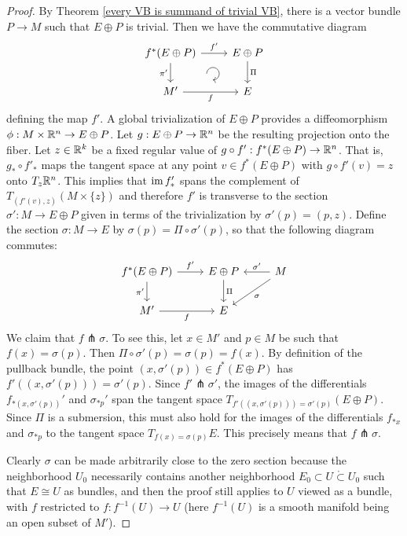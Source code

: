 \begin{proof}
By Theorem \ref{every VB is summand of trivial VB}, there is a vector bundle $P{\to} M$ such that $E\oplus P$ is trivial. Then we have the commutative diagram
    \[\begin{tikzcd}[every matrix/.append style={name=m}, execute at end picture={\draw [<-] ([xshift=-11mm,yshift=1mm]m-2-2.north) arc[start angle=-90,delta angle=270,radius=0.2cm];}]
    f^\ast(E\oplus P) \arrow[r,"f'"]\arrow[d,swap,"\pi'"]& E\oplus P\arrow[d,"\Pi"] \\
    M'\arrow[r,swap,"f"]& E
    \end{tikzcd}\]
defining the map $f'$. A global trivialization of $E\oplus P$ provides a diffeomorphism $\phi:M\times\mathbb{R}^n\to E\oplus P$. Let $g:E\oplus P\to\mathbb{R}^n$ be the resulting projection onto the fiber. Let $z\in\mathbb{R}^k$ be a fixed regular value of $g\circ f':f^\ast(E\oplus P)\to\mathbb{R}^n$. That is, $g_\ast \circ f'_\ast$ maps the tangent space at any point $v\in f^\ast(E\oplus P)$ with $g\circ f'(v)=z$ onto $T_z\mathbb{R}^n$. This implies that $\operatorname{im} f_\ast '$ spans the complement of $T_{(f'(v),z)}(M\times\{z\})$ and therefore $f'$ is transverse to the section $\sigma':M\to E\oplus P$ given in terms of the trivialization by $\sigma'(p)=(p,z)$. Define the section $\sigma:M\to E$ by $\sigma(p)=\Pi\circ \sigma'(p)$, so that the following diagram commutes:
  \[\begin{tikzcd}
    f^\ast(E\oplus P) \arrow[r,"f'"]\arrow[d,swap,"\pi'"]& E\oplus P\arrow[d,"\Pi"]& M\arrow[l,swap,"\sigma'"] \arrow[dl,"\sigma"]\\
    M'\arrow[r,swap,"f"]& E &
    \end{tikzcd}\]
We claim that $f\pitchfork \sigma$. To see this, let $x\in M'$ and $p\in M$ be such that $f(x)=\sigma(p)$. Then $\Pi\circ\sigma'(p)=\sigma(p)=f(x)$. By definition of the pullback bundle, the point $(x,\sigma'(p))\in f^\ast(E\oplus P)$ has $f'((x,\sigma'(p)))=\sigma'(p)$. Since $f'\pitchfork \sigma'$, the images of the differentials $f_{\ast(x,\sigma'(p))} '$ and $\sigma_{\ast p}'$ span the tangent space $T_{f'((x,\sigma'(p)))=\sigma'(p)}(E\oplus P)$. Since $\Pi$ is a submersion, this must also hold for the images of the differentials $f_{\ast x}$ and $\sigma_{\ast p}$ to the tangent space $T_{f(x)=\sigma(p)}E$. This precisely means that $f\pitchfork\sigma$.

Clearly $\sigma$ can be made arbitrarily close to the zero section because the neighborhood $U_0$ necessarily contains another neighborhood $E_0\subset U\mathring{\subset} U_0$ such that $E\cong U$ as bundles, and then the proof still applies to $U$ viewed as a bundle, with $f$ restricted to $f:f^{-1}(U)\to U$ (here $f^{-1}(U)$ is a smooth manifold being an open subset of $M'$).
\end{proof}

